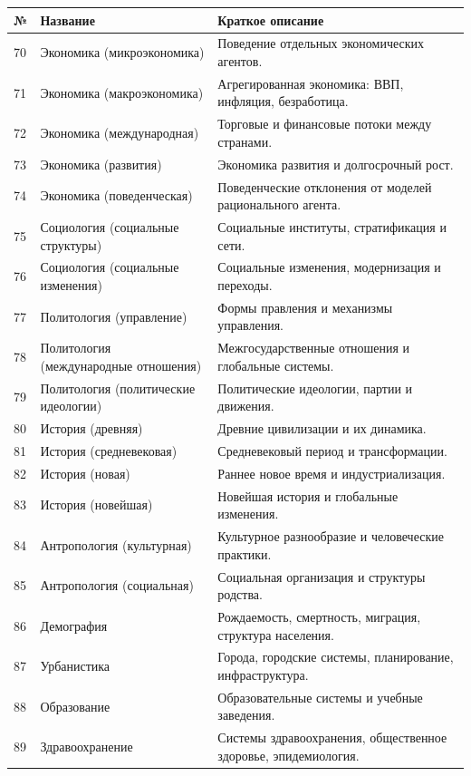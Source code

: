 \documentclass[11pt,a4paper]{article}
\begin{document}
	\begin{longtable}{|p{0.9cm}|p{6.0cm}|p{8.6cm}|}
		\hline
		\textbf{№} & \textbf{Название} & \textbf{Краткое описание} \\
		\hline
		\endhead
		70 & Экономика (микроэкономика) & Поведение отдельных экономических агентов. \\
		71 & Экономика (макроэкономика) & Агрегированная экономика: ВВП, инфляция, безработица. \\
		72 & Экономика (международная) & Торговые и финансовые потоки между странами. \\
		73 & Экономика (развития) & Экономика развития и долгосрочный рост. \\
		74 & Экономика (поведенческая) & Поведенческие отклонения от моделей рационального агента. \\
		75 & Социология (социальные структуры) & Социальные институты, стратификация и сети. \\
		76 & Социология (социальные изменения) & Социальные изменения, модернизация и переходы. \\
		77 & Политология (управление) & Формы правления и механизмы управления. \\
		78 & Политология (международные отношения) & Межгосударственные отношения и глобальные системы. \\
		79 & Политология (политические идеологии) & Политические идеологии, партии и движения. \\
		80 & История (древняя) & Древние цивилизации и их динамика. \\
		81 & История (средневековая) & Средневековый период и трансформации. \\
		82 & История (новая) & Раннее новое время и индустриализация. \\
		83 & История (новейшая) & Новейшая история и глобальные изменения. \\
		84 & Антропология (культурная) & Культурное разнообразие и человеческие практики. \\
		85 & Антропология (социальная) & Социальная организация и структуры родства. \\
		86 & Демография & Рождаемость, смертность, миграция, структура населения. \\
		87 & Урбанистика & Города, городские системы, планирование, инфраструктура. \\
		88 & Образование & Образовательные системы и учебные заведения. \\
		89 & Здравоохранение & Системы здравоохранения, общественное здоровье, эпидемиология. \\
	\end{longtable}
	
\end{document}
